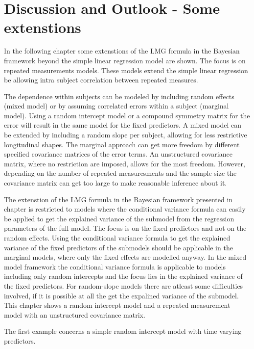 \documentclass[11pt,a4paper,twoside]{book}
\begin{document}





\chapter{Discussion and Outlook - Some extenstions}

In the following chapter some extenstions of the LMG formula in the Bayesian framework beyond the simple linear regression model are shown. The focus is on repeated measurements models. These models extend the simple linear regression be allowing intra subject correlation between repeated measures. 

The dependence within subjects can be modeled by including random effects (mixed model) or by assuming correlated errors within a subject (marginal model). Using a random intercept model or a compound symmetry matrix for the error will result in the same model for the fixed predictors. A mixed model can be extended by including a random slope per subject, allowing for less restrictive longitudinal shapes. The marginal approach can get more freedom by different specified covariance matrices of the error terms. An unstructured covariance matrix, where no restriction are imposed, allows for the most freedom. However, depending on the number of repeated measuresments and the sample size the covariance matrix can get too large to make reasonable inference about it. 


The extenstion of the LMG formula in the Bayesian framework presented in chapter is restricted to models where the conditional variance formula can easily be applied to get the explained variance of the submodel from the regression parameters of the full model. The focus is on the fixed predictors and not on the random effects. Using the conditional variance formula to get the explained variance of the fixed predictors of the submodels should be applicable in the marginal models, where only the fixed effects are modelled anyway. In the mixed model framework the conditional variance formula is applicable to models including only random intercepts and the focus lies in the explained variance of the fixed predictors. For random-slope models there are atleast some difficulties involved, if it is possible at all the get the expalined variance of the submodel. This chapter shows a  random intercept model and a repeated measurement model with an unstructured covariance matrix.  

The first example concerns a simple random intercept model with time varying predictors.  
\end{document}
